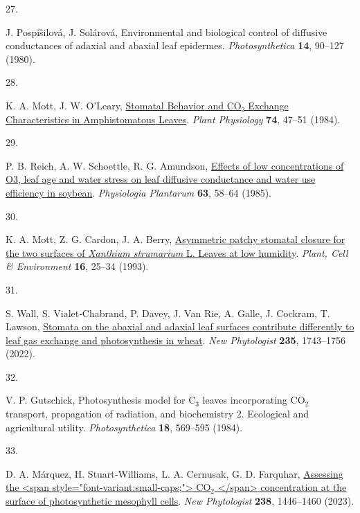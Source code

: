 \documentclass[
  letterpaper,
  DIV=11,
  numbers=noendperiod]{scrartcl}
\newlength{\cslhangindent}
\newlength{\csllabelwidth}
\newenvironment{CSLReferences}[2] %
 {\begin{list}{}{%
  \setlength{\itemindent}{0pt}
  \setlength{\leftmargin}{0pt}
  \setlength{\parsep}{0pt}
  \ifodd #1
   \setlength{\leftmargin}{\cslhangindent}
   \setlength{\itemindent}{-1\cslhangindent}
  \fi
  \setlength{\itemsep}{#2\baselineskip}}}
 {\end{list}}
\newcommand{\CSLLeftMargin}[1]{\parbox[t]{\csllabelwidth}{\strut#1\strut}}
\newcommand{\CSLRightInline}[1]{\parbox[t]{\linewidth - \csllabelwidth}{\strut#1\strut}}
\begin{document}
\begin{CSLReferences}{0}{1}
\CSLLeftMargin{27. }%
\CSLRightInline{J. Pospíŝilová, J. Solárová, Environmental and
biological control of diffusive conductances of adaxial and abaxial leaf
epidermes. \emph{Photosynthetica} \textbf{14}, 90--127 (1980).}

\CSLLeftMargin{28. }%
\CSLRightInline{K. A. Mott, J. W. O'Leary,
\href{http://www.jstor.org/stable/4268406}{Stomatal {Behavior} and {CO}₂
{Exchange} {Characteristics} in {Amphistomatous} {Leaves}}. \emph{Plant
Physiology} \textbf{74}, 47--51 (1984).}

\CSLLeftMargin{29. }%
\CSLRightInline{P. B. Reich, A. W. Schoettle, R. G. Amundson,
\href{https://doi.org/10.1111/j.1399-3054.1985.tb02818.x}{Effects of low
concentrations of {O3}, leaf age and water stress on leaf diffusive
conductance and water use efficiency in soybean}. \emph{Physiologia
Plantarum} \textbf{63}, 58--64 (1985).}

\CSLLeftMargin{30. }%
\CSLRightInline{K. A. Mott, Z. G. Cardon, J. A. Berry,
\href{https://doi.org/10.1111/j.1365-3040.1993.tb00841.x}{Asymmetric
patchy stomatal closure for the two surfaces of \emph{{Xanthium}
strumarium} {L}. Leaves at low humidity}. \emph{Plant, Cell \&
Environment} \textbf{16}, 25--34 (1993).}

\CSLLeftMargin{31. }%
\CSLRightInline{S. Wall, S. Vialet‐Chabrand, P. Davey, J. Van Rie, A.
Galle, J. Cockram, T. Lawson,
\href{https://doi.org/10.1111/nph.18257}{Stomata on the abaxial and
adaxial leaf surfaces contribute differently to leaf gas exchange and
photosynthesis in wheat}. \emph{New Phytologist} \textbf{235},
1743--1756 (2022).}

\CSLLeftMargin{32. }%
\CSLRightInline{V. P. Gutschick, Photosynthesis model for
{C}\(_{\textrm{3}}\) leaves incorporating {CO}\(_{\textrm{2}}\)
transport, propagation of radiation, and biochemistry 2. Ecological and
agricultural utility. \emph{Photosynthetica} \textbf{18}, 569--595
(1984).}

\CSLLeftMargin{33. }%
\CSLRightInline{D. A. Márquez, H. Stuart‐Williams, L. A. Cernusak, G. D.
Farquhar, \href{https://doi.org/10.1111/nph.18784}{Assessing the
{\textless{}}span style="font-variant:small-caps;"{\textgreater{}}
{CO}\(_{\textrm{2}}\) {\textless{}}/span{\textgreater{}} concentration
at the surface of photosynthetic mesophyll cells}. \emph{New
Phytologist} \textbf{238}, 1446--1460 (2023).}


\end{CSLReferences}
\end{document}
